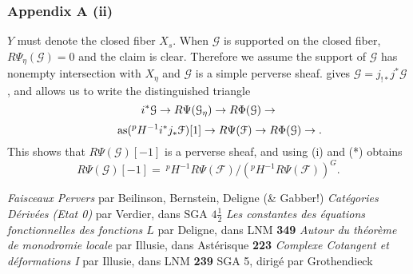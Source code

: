 \documentclass[deligne.tex]{subfiles}
\begin{document}
\subsubsection*{Appendix A (ii)}
$Y$ must denote the closed fiber $X_s$. When $\mathcal G$ is supported on
the closed fiber, $R\Psi_\eta(\mathcal G)=0$ and the claim is clear.
Therefore we assume the support of $\mathcal G$ has nonempty intersection 
with $X_\eta$ and $\mathcal G$ is a simple perverse sheaf.
\cite[4.3.1 \& 4.3.2]{BBD} gives $\mathcal G=j_{!*}j^*\mathcal G$, and
\cite[4.1.12]{BBD} allows us to write the distinguished triangle
\begin{equation*}
	i^*\mathcal G\rightarrow R\Psi(\mathcal G_\eta)\rightarrow R\Phi(\mathcal G)\rightarrow
\end{equation*}
\leqnomode
\begin{equation*}\tag*{as}
	(^pH^{-1}i^*j_*\mathcal F)[1]\rightarrow R\Psi(\mathcal F)\rightarrow R\Phi(\mathcal G)\rightarrow.
\end{equation*}
\reqnomode
This shows that $R\Psi(\mathcal G)[-1]$ is a perverse sheaf, and using
(i) and (*) obtains
\begin{equation*}
	R\Psi(\mathcal G)[-1]
	=\ ^pH^{-1}R\Psi(\mathcal F)/(^pH^{-1}R\Psi(\mathcal F))^G.
\end{equation*}




\begin{thebibliography}{SGA5}
	 \textit{Faisceaux Pervers}
	par Beilinson, Bernstein, Deligne (\& Gabber!)
	 \textit{Catégories Dérivées (Etat 0)} par Verdier,
	dans SGA $4\frac12$
	 \emph{Les constantes des équations fonctionnelles des fonctions $L$} par Deligne, dans LNM \textbf{349}
	 \emph{Autour du théorème de monodromie locale} par Illusie, dans Astérisque \textbf{223}
	 \emph{Complexe Cotangent et déformations I} par Illusie, dans LNM \textbf{239}
	 SGA 5, dirigé par Grothendieck
\end{thebibliography}
\end{document}
